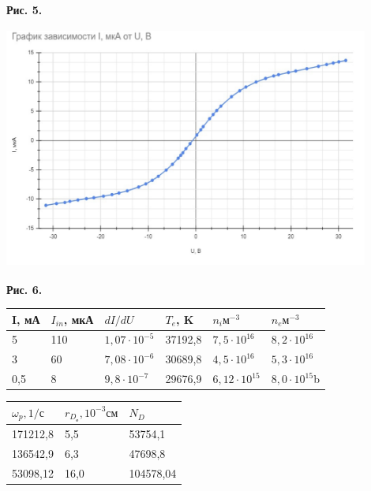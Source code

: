 \documentclass [a4paper, 12pt]{article}
\begin{document}
\begin{flushright}
{\small \textbf{Рис. 5.} }
\end{flushright}
\begin{center}
\includegraphics[width=12cm, height=8cm]{Py1_351.jpg}
\end{center}
\begin{flushright}
{\small \textbf{Рис. 6.} }
\end{flushright}


\begin{table}[]
\centering
\begin{tabular}{|l|l|l|l|l|l|}
\hline
I, мА & $I_{in}$, мкА & $dI/dU$ & $T_e$, K & $n_i м^{-3}$ & $n_e м^{-3}$ \\ \hline
5 & 110 & $1,07\cdot10^{-5}$ & 37192,8 & $7,5\cdot10^{16}$ & $8,2\cdot10^{16}$ \\ \hline
3 & 60 & $7,08\cdot10^{-6}$ & 30689,8 &  $4,5\cdot10^{16}$ & $5,3\cdot10^{16}$ \\ \hline
0,5 & 8 & $9,8\cdot10^{-7}$ & 29676,9 & $6,12\cdot10^{15} $ & $8,0\cdot10^{15}$b \\ \hline
\end{tabular}
\end{table}

\begin{table}[]
\centering
\begin{tabular}{|l|l|l|}
\hline
$\omega_p, 1/с$ & $r_{D_е}, 10^{-3} см$ & $N_D$\\ \hline
171212,8 & 5,5 & 53754,1 \\ \hline
136542,9 & 6,3 & 47698,8 \\ \hline
53098,12 & 16,0 & 104578,04 \\ \hline
\end{tabular}
\end{table}
\end{document}

